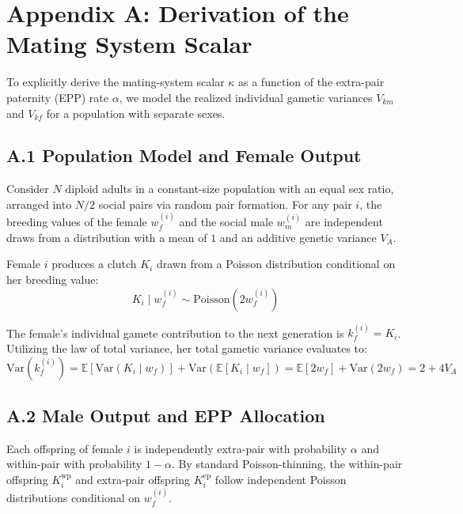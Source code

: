 \documentclass[11pt]{article}
\begin{document}
\section*{Appendix A: Derivation of the Mating System Scalar}

To explicitly derive the mating-system scalar $\kappa$ as a function of the extra-pair paternity (EPP) rate $\alpha$, we model the realized individual gametic variances $V_{km}$ and $V_{kf}$ for a population with separate sexes.

\subsection*{A.1 Population Model and Female Output}
Consider $N$ diploid adults in a constant-size population with an equal sex ratio, arranged into $N/2$ social pairs via random pair formation. For any pair $i$, the breeding values of the female $w_f^{(i)}$ and the social male $w_m^{(i)}$ are independent draws from a distribution with a mean of $1$ and an additive genetic variance $V_A$.

Female $i$ produces a clutch $K_i$ drawn from a Poisson distribution conditional on her breeding value:
\begin{equation}
    K_i \mid w_f^{(i)} \sim \mathrm{Poisson}(2 w_f^{(i)})
\end{equation}

The female's individual gamete contribution to the next generation is $k_f^{(i)} = K_i$. Utilizing the law of total variance, her total gametic variance evaluates to:
\begin{equation}
    \text{Var}(k_f^{(i)}) = \mathbb{E}[\text{Var}(K_i \mid w_f)] + \text{Var}(\mathbb{E}[K_i \mid w_f]) = \mathbb{E}[2 w_f] + \text{Var}(2 w_f) = 2 + 4 V_A
\end{equation}

\subsection*{A.2 Male Output and EPP Allocation}
Each offspring of female $i$ is independently extra-pair with probability $\alpha$ and within-pair with probability $1-\alpha$. By standard Poisson-thinning, the within-pair offspring $K_i^{\text{wp}}$ and extra-pair offspring $K_i^{\text{ep}}$ follow independent Poisson distributions conditional on $w_f^{(i)}$.
\end{document}
